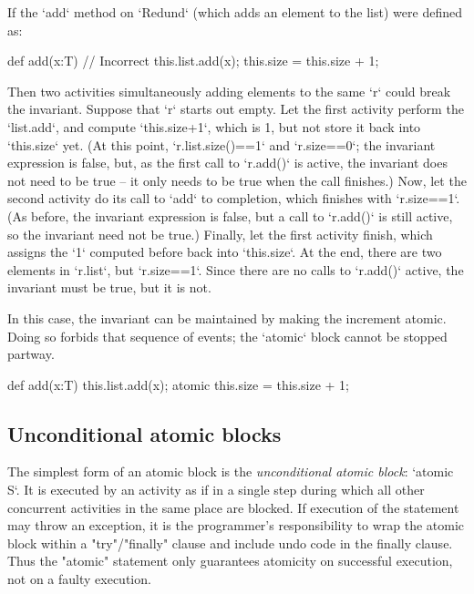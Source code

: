 If the \xcd`add` method on \xcd`Redund` (which adds an element to the list) 
were defined as: 
\begin{xten}
def add(x:T) { // Incorrect
  this.list.add(x);
  this.size = this.size + 1;
}
\end{xten}
Then two activities simultaneously adding elements to the same \xcd`r` could break the
invariant.  Suppose that \xcd`r` starts out empty.  Let the first activity
perform the \xcd`list.add`, and compute \xcd`this.size+1`, which is 1, but not store it
back into \xcd`this.size` yet.  
(At this point, \xcd`r.list.size()==1` and \xcd`r.size==0`; the invariant
expression is false, but, as the first call to \xcd`r.add()` is active, the
invariant does not need to be true -- it only needs to be true when the
call finishes.)
Now, let the second activity do its call to
\xcd`add` to completion, which finishes with \xcd`r.size==1`.  
(As before, the invariant expression is false, but a call to \xcd`r.add()` is
still active, so the invariant need not be true.)
Finally, let
the first activity finish, which assigns the \xcd`1` computed before back into
\xcd`this.size`.  At the end, there are two elements in \xcd`r.list`, but
\xcd`r.size==1`. Since there are no calls to \xcd`r.add()` active, the
invariant must be true, but it is not.

In this case, the invariant can be maintained by making the increment atomic.
Doing so forbids that sequence of events; the \xcd`atomic` block cannot be
stopped partway.  
\begin{xten}
def add(x:T) { 
  this.list.add(x);
  atomic { this.size = this.size + 1; }
}
\end{xten}

\subsection{Unconditional atomic blocks}
The simplest form of an atomic block is the {\em unconditional
atomic block}: \xcd`atomic S`.
It is executed by an activity as if in a single step
during which all other concurrent activities in the same place are
blocked. If execution of the statement may throw an exception, it is
the programmer's responsibility to wrap the atomic block within a
\xcd"try"/\xcd"finally" clause and include undo code in the finally
clause. Thus the \xcd"atomic" statement only guarantees atomicity on
successful execution, not on a faulty execution.


